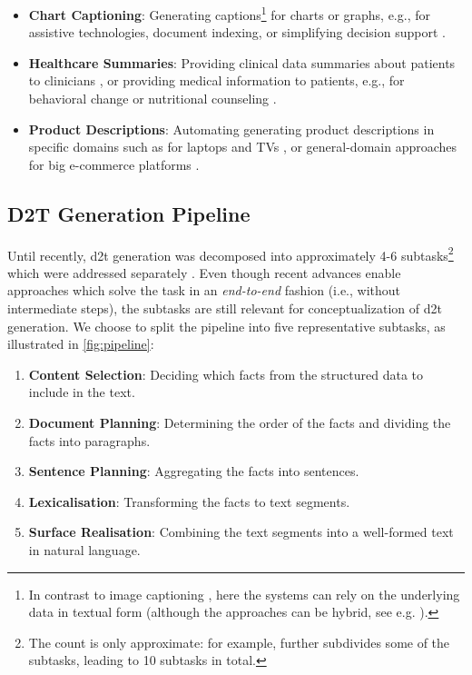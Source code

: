 {\begin{itemize}
    \item \textbf{Chart Captioning}: Generating captions\footnote{In contrast to image captioning \cite{stefanini2022show}, here the systems can rely on the underlying data in textual form (although the approaches can be hybrid, see e.g. \citealp{kantharajCharttoTextLargeScaleBenchmark2022}).} for charts or graphs, e.g., for assistive technologies, document indexing, or simplifying decision support \cite{demirGeneratingTextualSummaries2008,demirSummarizingInformationGraphics2012,obeidCharttoTextGeneratingNatural2020,kantharajCharttoTextLargeScaleBenchmark2022}.
    \item \textbf{Healthcare Summaries}: Providing clinical data summaries about patients to clinicians \cite{portet2009automatic,scott2013data}, or providing medical information to patients, e.g., for behavioral change \cite{reiter2003lessons} or nutritional counseling \cite{balloccu-reiter-2022-comparing}.
    \item \textbf{Product Descriptions}: Automating generating product descriptions in specific domains such as for laptops and TVs \cite{wen2015toward,wen2016multi}, or general-domain approaches for big e-commerce platforms \cite{shaoControllableDiverseText2021,kotoCanPretrainedLanguage2022}.
\end{itemize}

\subsection{D2T Generation Pipeline}
\label{sec:d2t-pipeline}


Until recently, \ac{d2t} generation was decomposed into approximately 4-6 subtasks\footnote{The count is only approximate: for example, \citet{milleModD2TMultilayerDataset2023} further subdivides some of the subtasks, leading to 10 subtasks in total.} which were addressed separately \cite{reiterBuildingAppliedNatural1997,Reiter_Dale_2000,reiterArchitectureDatatoTextSystems2007,gattSurveyStateArt2018}. Even though recent advances enable approaches which solve the task in an \emph{end-to-end} fashion (i.e., without intermediate steps), the subtasks are still relevant for conceptualization of \ac{d2t} generation. We choose to split the pipeline into five representative subtasks, as illustrated in \autoref{fig:pipeline}:

\begin{enumerate}
    \item \textbf{Content Selection}: Deciding which facts from the structured data
          to include in the text.
    \item \textbf{Document Planning}: Determining the order of the
          facts and dividing the facts into paragraphs.
    \item \textbf{Sentence Planning}: Aggregating the facts into
          sentences.
    \item \textbf{Lexicalisation}: Transforming the facts to text segments.
    \item \textbf{Surface Realisation}: Combining the text segments into a well-formed text in natural language.
\end{enumerate}


}
